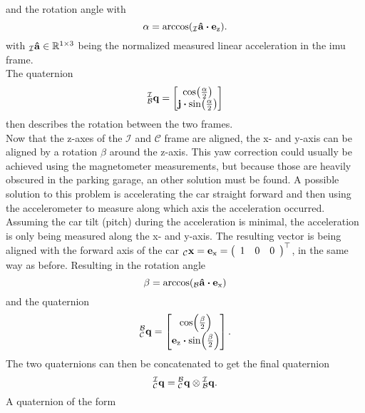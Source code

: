 and the rotation angle with
\begin{equation}
    \alpha = \arccos(\vincs{\vu{a}}{i}\vdot \vb{e}_\mathrm{z}).
\end{equation}
with $\vincs{\vu{a}}{i} \in \mathbb{R}^{1\times3}$ being the normalized measured linear acceleration in the \gls{imu} frame.\\
The quaternion
\begin{equation}
    \qtf{i}{b} =
    \begin{bmatrix}
        \cos(\frac{\alpha}{2})\\
        \vb{j}\vdot\sin(\frac{\alpha}{2})
    \end{bmatrix}
\end{equation}
then describes the rotation between the two frames.\\
Now that the z-axes of the $\mathcal{I}$ and $\mathcal{C}$ frame are aligned, the x- and y-axis can be aligned by a rotation $\beta$ around the z-axis.
This yaw correction could usually be achieved using the magnetometer measurements, but because those are heavily obscured in the parking garage, an other solution must be found.
A possible solution to this problem is accelerating the car straight forward and then using the accelerometer to measure along which axis the acceleration occurred.
Assuming the car tilt (pitch) during the acceleration is minimal, the acceleration is only being measured along the x- and y-axis.
The resulting vector is being aligned with the forward axis of the car $\vincs{x}{c} = \mathbf{e}_\mathrm{x} = \left(\begin{array}{lll} 1 & 0 & 0 \end{array}\right)^{\top}$, in the same way as before.
Resulting in the rotation angle
\begin{equation}
    \beta = \arccos(\vincs{\vu{a}}{b} \vdot \vb{e}_\mathrm{x})
\end{equation}
and the quaternion
\begin{equation}
    \qtf{b}{c} =
    \begin{bmatrix}
        \cos(\frac{\beta}{2})\\
        \vb{e}_\mathrm{z}\vdot\sin(\frac{\beta}{2})
    \end{bmatrix}.
\end{equation}
The two quaternions can then be concatenated to get the final quaternion
\begin{equation}
    \qtf{i}{c} = \qtf{b}{c} \otimes  \qtf{i}{b}.
\end{equation}
A quaternion of the form
